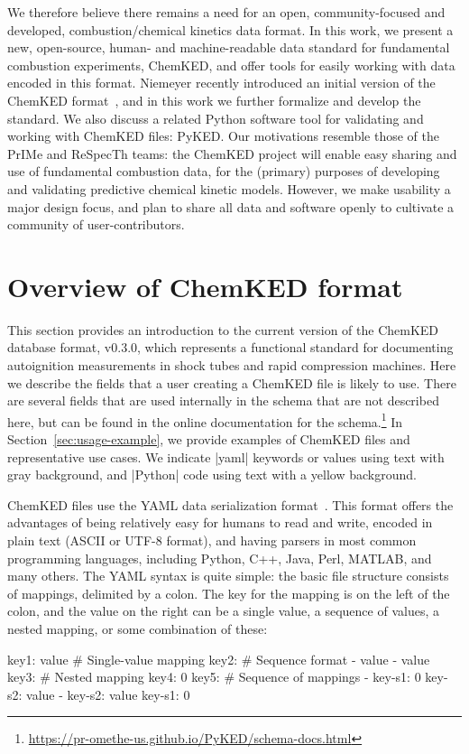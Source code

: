 \documentclass[12pt]{ijck}
\newcommand\ck{ChemKED}
\newcommand\pk{PyKED}
\begin{document}
We therefore believe there remains a need for an open, community-focused and
developed, combustion\slash chemical kinetics data format. In this work, we
present a new, open-source, human- and machine-readable data standard for
fundamental combustion experiments, \ck{}, and offer tools for easily working
with data encoded in this format. Niemeyer recently introduced an initial
version of the \ck{} format~\autocite{Niemeyer:2016wf}, and in this work we
further formalize and develop the standard. We also discuss a related Python
software tool for validating and working with \ck{} files: \pk{}. Our
motivations resemble those of the PrIMe and ReSpecTh teams: the \ck{} project
will enable easy sharing and use of fundamental combustion data, for the
(primary) purposes of developing and validating predictive chemical kinetic
models. However, we make usability a major design focus, and plan to share all
data and software openly to cultivate a community of user-contributors.

\section{Overview of ChemKED format}
\label{sec:overview-of-format}

This section provides an introduction to the current version of the \ck{} database format, v0.3.0,
which represents a functional standard for documenting autoignition measurements in shock tubes and
rapid compression machines. Here we describe the fields that a user creating a \ck{} file is likely
to use. There are several fields that are used internally in the schema that are not described here,
but can be found in the online documentation for the
schema.\footnote{\url{https://pr-omethe-us.github.io/PyKED/schema-docs.html}} In
Section~\ref{sec:usage-example}, we provide examples of \ck{} files and representative use cases. We
indicate \yabox|yaml| keywords or values using text with gray background, and \pybox|Python| code
using text with a yellow background.

\ck{} files use the YAML data serialization format~\autocite{yaml:1.2}. This
format offers the advantages of being relatively easy for humans to read and write,
encoded in plain text (ASCII or UTF-8 format), and
having parsers in most common programming languages, including Python, C++, Java,
Perl, MATLAB, and many others. The YAML syntax is quite simple: the basic file
structure consists of mappings, delimited by a colon. The key for the mapping is
on the left of the colon, and the value on the right can be a single value,
a sequence of values, a nested mapping, or some combination of these:
%
\begin{yamlbox}
key1: value  # Single-value mapping
key2:  # Sequence format
  - value
  - value
key3:  # Nested mapping
  key4: 0
key5:  # Sequence of mappings
  - key-s1: 0
    key-s2: value
  - key-s2: value
    key-s1: 0
\end{yamlbox}
\end{document}
